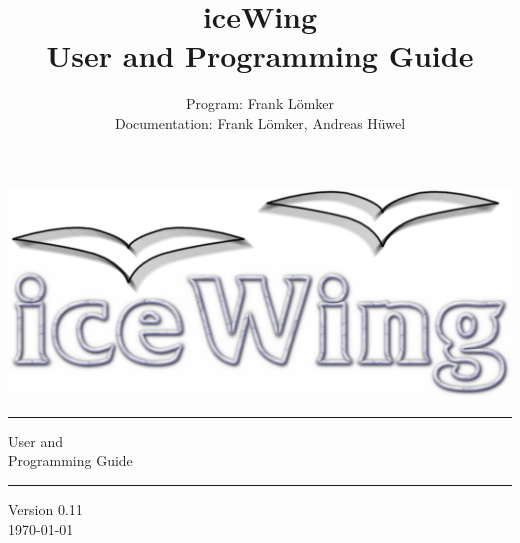 \documentclass[a4paper,12pt,twoside,headsepline,pointlessnumbers,idxtotoc,bibtotoc,BCOR0.6cm]{scrreprt}
\newcommand{\icewing}{\textsf{iceWing}}
\begin{document}
\title{\icewing\\User and Programming Guide}
\author{Program: Frank L\"omker\\
  Documentation: Frank L\"omker, Andreas H\"uwel}

\begin{titlepage}
  \begin{center}
    \sf
    \includegraphics[width=14.5cm]{images/iw_titel}

    \rule{\textwidth}{1pt}\vspace{-0.2cm}
    {\titelfont\baselineskip54pt%
      User and\\
      Programming Guide\par}\vspace{0.2cm}

    \rule{\textwidth}{1pt}
    \vspace*{1cm}

    {\titelsmall\baselineskip24pt Version 0.11\\ \today{}\par}
  \end{center}
\end{titlepage}
\cleardoublepage

\tableofcontents
\cleardoublepage









\printindex
\end{document}
